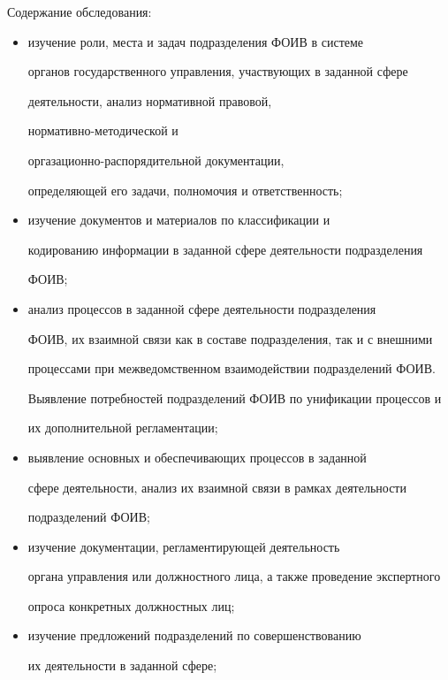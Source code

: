       


      Содержание обследования: 


      \begin{itemize}


      \item изучение роли, места и задач подразделения ФОИВ в системе 


органов государственного управления, участвующих в заданной сфере 


деятельности, анализ нормативной правовой, 


      нор\-ма\-тив\-но-ме\-то\-ди\-че\-ской и 


      орга\-за\-ци\-он\-но-рас\-по\-ря\-ди\-тель\-ной документации, 


определяющей его задачи, полномочия и ответственность;


      \item  изучение документов и материалов по классификации и 


кодированию информации в заданной сфере деятельности подразделения 


ФОИВ;


      \item анализ процессов  в заданной сфере деятельности подразделения 


ФОИВ, их взаимной связи как в составе подразделения, так и с внешними 


процессами при межведомственном взаимодействии подразделений ФОИВ. 


Выявление потребностей подразделений ФОИВ по унификации процессов и 


их дополнительной  регламентации;


      \item выявление основных и обеспечивающих процессов в заданной 


сфере деятельности, анализ их взаимной связи в рамках деятельности 


подразделений ФОИВ;


      \item изучение документации, регламентирующей деятельность 


органа управления или должностного лица, а также проведение экспертного 


опроса конкретных должностных лиц;


      \item изучение предложений подразделений по совершенствованию 


их деятель\-ности в заданной сфере; 



\end{itemize}
